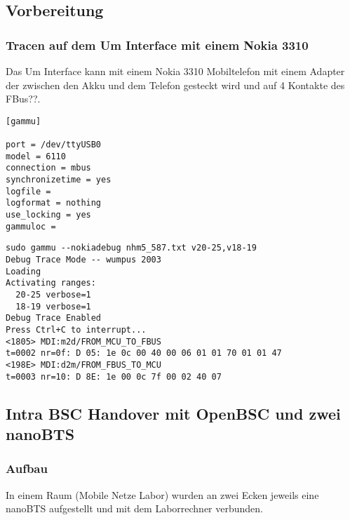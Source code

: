 \label{sec:analyse}

\subsection{Vorbereitung}
\subsubsection{Tracen auf dem Um Interface mit einem Nokia 3310}
Das Um Interface kann mit einem Nokia 3310 Mobiltelefon mit einem Adapter der zwischen den Akku und dem Telefon gesteckt wird und auf 4 Kontakte des FBus??.

\begin{lstlisting}[label=config:gammu,caption={Konfigurationsdatei für gammu und dem verwendeten Adapter}]
[gammu]

port = /dev/ttyUSB0
model = 6110
connection = mbus
synchronizetime = yes
logfile = 
logformat = nothing
use_locking = yes
gammuloc = 
\end{lstlisting}

\begin{lstlisting}[label=command:gammu,caption={Aufruf von Gammu}]
sudo gammu --nokiadebug nhm5_587.txt v20-25,v18-19
Debug Trace Mode -- wumpus 2003
Loading
Activating ranges:
  20-25 verbose=1
  18-19 verbose=1
Debug Trace Enabled
Press Ctrl+C to interrupt...
<1805> MDI:m2d/FROM_MCU_TO_FBUS
t=0002 nr=0f: D 05: 1e 0c 00 40 00 06 01 01 70 01 01 47 
<198E> MDI:d2m/FROM_FBUS_TO_MCU
t=0003 nr=10: D 8E: 1e 00 0c 7f 00 02 40 07 
\end{lstlisting}

\subsection{Intra BSC Handover mit OpenBSC und zwei nanoBTS}


\subsubsection{Aufbau}
In einem Raum (Mobile Netze Labor) wurden an zwei Ecken jeweils eine nanoBTS aufgestellt und mit dem Laborrechner verbunden. 
